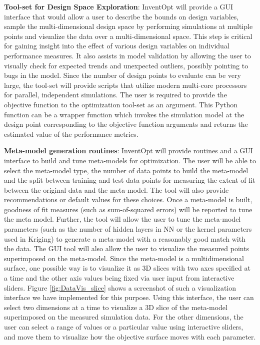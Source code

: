     \textbf{Tool-set for Design Space Exploration}: InventOpt will provide a GUI interface that would allow a user to describe the bounds on design variables, sample the multi-dimensional design space by performing simulations at multiple points and visualize the data over a multi-dimensional space. This step is critical for gaining insight into the effect of various design variables on individual performance measures. It also assists in model validation by allowing the user to visually check for expected trends and unexpected outliers, possibly pointing to bugs in the model. Since the number of design points to evaluate can be very large, the tool-set will provide scripts that utilize modern multi-core processors for parallel, independent simulations.  The user is required to provide the objective function to the optimization tool-set as an argument. This Python function can be a wrapper function which invokes the simulation model at the design point corresponding to the objective function arguments and returns the estimated value of the performance metrics.    
     
    \textbf{Meta-model generation routines}: InventOpt will provide routines and a GUI interface to build and tune meta-models for optimization. The user will be able to select the meta-model type, the number of data points to build the meta-model and the split between training and test data points for measuring the extent of fit between the original data and the meta-model. The tool will also provide recommendations or default values for these choices. Once a meta-model is built, goodness of fit measures (such as sum-of-squared errors) will be reported to tune the meta model. 
    Further, the tool will allow the user to tune the meta-model parameters (such as the number of hidden layers in NN or the kernel parameters used in Kriging) to generate a meta-model with a reasonably good match with the data. The GUI tool will also allow the user to visualize the measured points superimposed on the meta-model. Since the meta-model is a multidimensional surface, one possible way is to visualize it as 3D slices with two axes specified at a time and the other axis values being fixed via user input from interactive sliders. Figure \ref{fig:DataVis_slice} shows a screenshot of such a visualization interface we have implemented for this purpose. Using this interface, the user can select two dimensions at a time to visualize a 3D slice of the meta-model superimposed on the measured simulation data. For the other dimensions, the user can select a range of values or a particular value using interactive sliders, and move them to visualize how the objective surface moves with each parameter.
               
